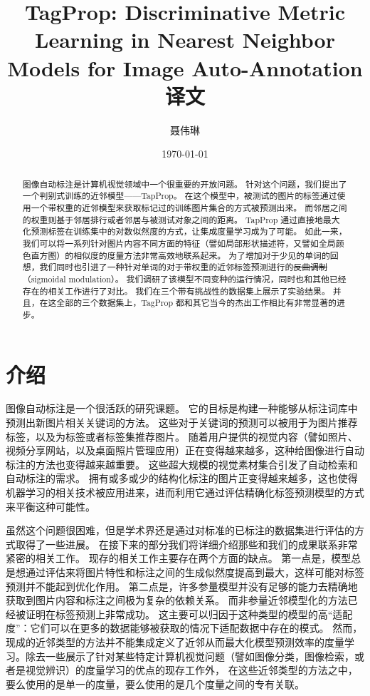 \documentclass[a4paper,twocolumn]{ctexart}
\title{TagProp: Discriminative Metric Learning in Nearest Neighbor Models for Image Auto-Annotation 译文}
\author{聂伟琳}
\date{\today}
\begin{document}
\maketitle

\begin{abstract}

图像自动标注是计算机视觉领域中一个很重要的开放问题。
针对这个问题，我们提出了一个判别式训练的近邻模型——TapProp。
在这个模型中，被测试的图片的标签通过使用一个带权重的近邻模型来获取标记过的训练图片集合的方式被预测出来。
而邻居之间的权重则基于邻居排行或者邻居与被测试对象之间的距离。
TapProp 通过直接地最大化预测标签在训练集中的对数似然度的方式，让集成度量学习成为了可能。
如此一来，我们可以将一系列针对图片内容不同方面的特征（譬如局部形状描述符，又譬如全局颜色直方图）的相似度的度量方法非常高效地联系起来。
为了增加对于少见的单词的回想，我们同时也引进了一种针对单词的对于带权重的近邻标签预测进行的\sout{反曲调制}（sigmoidal modulation）。
我们调研了该模型不同变种的运行情况，同时也和其他已经存在的相关工作进行了对比。
我们在三个带有挑战性的数据集上展示了实验结果。
并且，在这全部的三个数据集上，TagProp 都和其它当今的杰出工作相比有非常显著的进步。

\end{abstract}

\part{介绍}

图像自动标注是一个很活跃的研究课题\cite{7,15,16,18}。
它的目标是构建一种能够从标注词库中预测出新图片相关关键词的方法。
这些对于关键词的预测可以被用于为图片推荐标签，以及为标签或者标签集推荐图片。
随着用户提供的视觉内容（譬如照片、视频分享网站，以及桌面照片管理应用）正在变得越来越多，这种给图像进行自动标注的方法也变得越来越重要。
这些超大规模的视觉素材集合引发了自动检索和自动标注的需求。
拥有或多或少的结构化标注的图片正变得越来越多，这也使得机器学习的相关技术被应用进来，进而利用它通过评估精确化标签预测模型的方式来平衡这种可能性。

虽然这个问题很困难，但是学术界还是通过对标准的已标注的数据集进行评估的方式取得了一些进展。
在接下来的部分我们将详细介绍那些和我们的成果联系非常紧密的相关工作。
现存的相关工作主要存在两个方面的缺点。
第一点是，模型总是想通过评估来将图片特性和标注之间的生成似然度提高到最大，这样可能对标签预测并不能起到优化作用。
第二点是，许多参量模型并没有足够的能力去精确地获取到图片内容和标注之间极为复杂的依赖关系。
而非参量近邻模型化的方法已经被证明在标签预测上非常成功\cite{5,11,13,17,22,27}。
这主要可以归因于这种类型的模型的高“适配度”：它们可以在更多的数据能够被获取的情况下适配数据中存在的模式。
然而，现成的近邻类型的方法并不能集成定义了近邻从而最大化模型预测效率的度量学习。除去一些展示了针对某些特定计算机视觉问题（譬如图像分类\cite{12}，图像检索\cite{10}，或者是视觉辨识\cite{9}）的度量学习的优点的现存工作外， 在这些近邻类型的方法之中，要么使用的是单一的度量\cite{5,27}，要么使用的是几个度量之间的专有关联\cite{17}。
\end{document}
